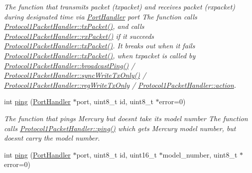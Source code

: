 \begin{DoxyCompactItemize}
\begin{DoxyCompactList}\small\item\em The function that transmits packet (txpacket) and receives packet (rxpacket) during designated time via \hyperlink{classmercury_1_1_port_handler}{Port\+Handler} port  The function calls \hyperlink{classmercury_1_1_protocol1_packet_handler_a232c9159fef54e7aaf38859fcce5a322}{Protocol1\+Packet\+Handler\+::tx\+Packet()},  and calls \hyperlink{classmercury_1_1_protocol1_packet_handler_aa6aad6db73d6f00b45c3c71aa8800b21}{Protocol1\+Packet\+Handler\+::rx\+Packet()} if it succeeds \hyperlink{classmercury_1_1_protocol1_packet_handler_a232c9159fef54e7aaf38859fcce5a322}{Protocol1\+Packet\+Handler\+::tx\+Packet()}.  It breaks out  when it fails \hyperlink{classmercury_1_1_protocol1_packet_handler_a232c9159fef54e7aaf38859fcce5a322}{Protocol1\+Packet\+Handler\+::tx\+Packet()},  when txpacket is called by \hyperlink{classmercury_1_1_protocol1_packet_handler_a7a7b443a3df3066ee50ef93044a1ee14}{Protocol1\+Packet\+Handler\+::broadcast\+Ping()} / \hyperlink{classmercury_1_1_protocol1_packet_handler_a53d5cfbbae7b9184e4c51051f1b426d1}{Protocol1\+Packet\+Handler\+::sync\+Write\+Tx\+Only()} / \hyperlink{classmercury_1_1_protocol1_packet_handler_a2307c9edac7cef2637f82103c0923075}{Protocol1\+Packet\+Handler\+::reg\+Write\+Tx\+Only} / \hyperlink{classmercury_1_1_protocol1_packet_handler_abdd0fb2ce6cda0c13925627020d02418}{Protocol1\+Packet\+Handler\+::action}. \end{DoxyCompactList}\item 
int \hyperlink{classmercury_1_1_protocol1_packet_handler_a77978d01da7288e2d1157907b5b0eb71}{ping} (\hyperlink{classmercury_1_1_port_handler}{Port\+Handler} $\ast$port, uint8\+\_\+t id, uint8\+\_\+t $\ast$error=0)
\begin{DoxyCompactList}\small\item\em The function that pings Mercury but doesn\textquotesingle{}t take its model number  The function calls \hyperlink{classmercury_1_1_protocol1_packet_handler_a77978d01da7288e2d1157907b5b0eb71}{Protocol1\+Packet\+Handler\+::ping()} which gets Mercury model number,  but doesn\textquotesingle{}t carry the model number. \end{DoxyCompactList}\item 
int \hyperlink{classmercury_1_1_protocol1_packet_handler_aac4b8ebf5af0bfb31b4a99b459181bde}{ping} (\hyperlink{classmercury_1_1_port_handler}{Port\+Handler} $\ast$port, uint8\+\_\+t id, uint16\+\_\+t $\ast$model\+\_\+number, uint8\+\_\+t $\ast$error=0)

\end{DoxyCompactItemize}
